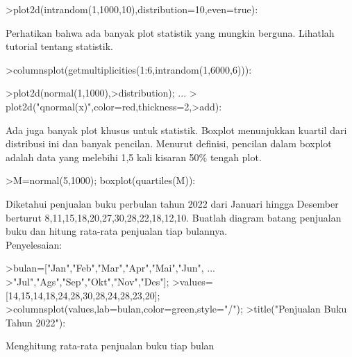 \documentclass{article}
\begin{document}
\begin{eulernotebook}
\begin{eulercomment}
\begin{eulercomment}
\begin{eulercomment}
\begin{eulercomment}
\begin{eulercomment}
\begin{eulercomment}
\begin{eulercomment}
\begin{eulercomment}
\begin{eulercomment}
\begin{eulercomment}
\begin{eulerprompt}
>plot2d(intrandom(1,1000,10),distribution=10,even=true):
\end{eulerprompt}
\begin{eulercomment}
Perhatikan bahwa ada banyak plot statistik yang mungkin berguna.
Lihatlah tutorial tentang statistik.
\end{eulercomment}
\begin{eulerprompt}
>columnsplot(getmultiplicities(1:6,intrandom(1,6000,6))):
\end{eulerprompt}
\begin{eulerprompt}
>plot2d(normal(1,1000),>distribution); ...
>  plot2d("qnormal(x)",color=red,thickness=2,>add):
\end{eulerprompt}
\begin{eulercomment}
Ada juga banyak plot khusus untuk statistik. Boxplot menunjukkan
kuartil dari distribusi ini dan banyak pencilan. Menurut definisi,
pencilan dalam boxplot adalah data yang melebihi 1,5 kali kisaran 50\%
tengah plot.
\end{eulercomment}
\begin{eulerprompt}
>M=normal(5,1000); boxplot(quartiles(M)):
\end{eulerprompt}
\eulersubheading{}
\begin{eulercomment}
Diketahui penjualan buku perbulan tahun 2022 dari Januari hingga
Desember berturut 8,11,15,18,20,27,30,28,22,18,12,10. Buatlah diagram
batang penjualan buku dan hitung rata-rata penjualan tiap bulannya.\\
Penyelesaian:
\end{eulercomment}
\begin{eulerprompt}
>bulan=["Jan","Feb","Mar","Apr","Mai","Jun", ...
>"Jul","Ags","Sep","Okt","Nov","Des"];
>values=[14,15,14,18,24,28,30,28,24,28,23,20];
>columnsplot(values,lab=bulan,color=green,style="/");
>title("Penjualan Buku Tahun 2022"):
\end{eulerprompt}
\begin{eulercomment}
Menghitung rata-rata penjualan buku tiap bulan
\end{eulercomment}
\begin{eulerprompt}

\end{eulerprompt}
\end{eulercomment}
\end{eulercomment}
\end{eulercomment}
\end{eulercomment}
\end{eulercomment}
\end{eulercomment}
\end{eulercomment}
\end{eulercomment}
\end{eulercomment}
\end{eulercomment}
\end{eulernotebook}
\end{document}
